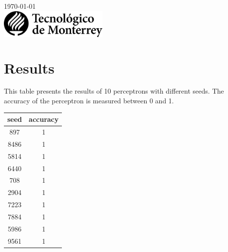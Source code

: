 \documentclass{article}
\begin{document}
\begin{titlepage}


    {\large \today}\\[2cm] %


    \includegraphics[width=0.4\textwidth,height=\textheight,keepaspectratio]{logo-tec-negro.png} %


    \vfill %

\end{titlepage}
\section{Results}

This table presents the results of 10 perceptrons with different seeds. The accuracy of the perceptron is measured between 0 and 1.

\begin{center}
    \begin{tabular}{| c | c |}
        \hline
        seed & accuracy \\
        \hline
        897	& 1 \\
        8486 & 1 \\
        5814 & 1 \\
        6440 & 1 \\
        708 & 1 \\
        2904 & 1 \\
        7223 & 1 \\
        7884 & 1 \\
        5986 & 1 \\
        9561 & 1 \\
        \hline
    \end{tabular}
\end{center}
\end{document}
